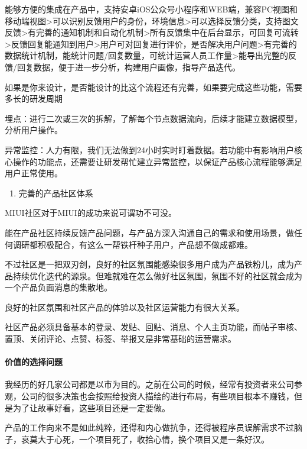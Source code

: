 \documentclass[letterpaper,11pt,english]{sphinxmanual}
\begin{document}
能够方便的集成在产品中，支持安卓iOS公众号小程序和WEB端，兼容PC视图和移动端视图\sphinxhyphen{}>可以识别反馈用户的身份，环境信息\sphinxhyphen{}>可以选择反馈分类，支持图文反馈\sphinxhyphen{}>有完善的通知机制和自动化机制\sphinxhyphen{}>所有反馈集中在后台显示，可回复可流转\sphinxhyphen{}>反馈回复能通知到用户\sphinxhyphen{}>用户可对回复进行评价，是否解决用户问题\sphinxhyphen{}>有完善的数据统计机制，能统计问题/回复数量，可统计运营人员工作量\sphinxhyphen{}>能导出完整的反馈/回复数据，便于进一步分析，构建用户画像，指导产品迭代。

如果是你来设计，是否能设计的比这个流程还有完善，如果要完成这些功能，需要多长的研发周期

埋点：进行二次或三次的拆解，了解每个节点数据流向，后续才能建立数据模型，分析用户操作。

异常监控：人力有限，我们无法做到24小时实时盯着数据。若功能中有影响用户核心操作的功能点，还需要让研发帮忙建立异常监控，以保证产品核心流程能够满足用户正常使用。
\begin{enumerate}
%
\item {} 
完善的产品社区体系

\end{enumerate}

MIUI社区对于MIUI的成功来说可谓功不可没。

能在产品社区持续反馈产品问题，与产品方深入沟通自己的需求和使用场景，做任何调研都积极配合，有这么一帮铁杆种子用户，产品想不做成都难。

不过社区是一把双刃剑，良好的社区氛围能感染很多用户成为产品铁粉儿，成为产品持续优化迭代的源泉。但难就难在怎么做好社区氛围，氛围不好的社区就会成为一个产品负面消息的集散地。

良好的社区氛围和社区产品的体验以及社区运营能力有很大关系。

社区产品必须具备基本的登录、发贴、回贴、消息、个人主页功能，而帖子审核、置顶、关闭评论、点赞、标签、举报又是非常基础的运营需求。


\paragraph{价值的选择问题}
\label{\detokenize{chapter_project/valuable:id5}}
我经历的好几家公司都是以市为目的。之前在公司的时候，经常有投资者来公司参观，公司的很多决策也会按照给投资人描绘的进行布局，有些项目根本不赚钱，但是为了让故事好看，这些项目还是一定要做。

产品的工作向来不是如此纯粹，还得和内心做抗争，还得被程序员误解需求不过脑子，哀莫大于心死，一个项目死了，收拾心情，换个项目又是一条好汉。
\end{document}
